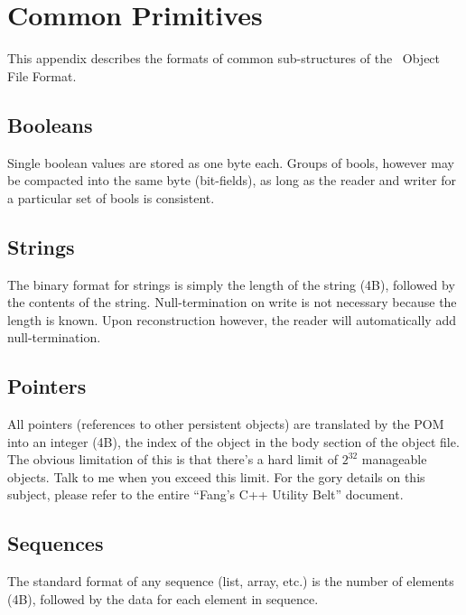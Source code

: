 
\chapter{Common Primitives}
\label{app:common}

This appendix describes the formats of common sub-structures of
the \hackt\ Object File Format.  

\section{Booleans}
\label{sec:common:bool}

Single boolean values are stored as one byte each.  
Groups of bools, however may be compacted into the same byte (bit-fields), 
as long as the reader and writer for a particular set of bools is consistent.  

\section{Strings}
\label{app:common:strings}

The binary format for strings is simply the length of the string (4B), 
followed by the contents of the string.  
Null-termination on write is not necessary because the length is known.  
Upon reconstruction however, 
the reader will automatically add null-termination.  

\section{Pointers}
\label{app:common:pointers}

All pointers (references to other persistent objects) are translated
by the POM into an integer (4B), 
the index of the object in the body section of the object file.  
The obvious limitation of this is that there's a hard limit of 
$2^{32}$ manageable objects.  
Talk to me when you exceed this limit.  
For the gory details on this subject, please refer to the entire
``Fang's C++ Utility Belt'' document.  

\section{Sequences}
\label{app:common:sequence}

The standard format of any sequence (list, array, etc.)
is the number of elements (4B), followed by the data for each
element in sequence.  


